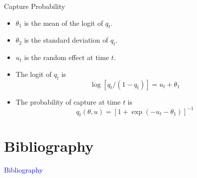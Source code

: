 \documentclass{beamer}
\newcommand{\Blue}[1]{\textcolor{blue}{#1}}
\newcommand{\Section}[1]{
	\section{#1}
	\begin{frame}
	\begin{center}
	\Blue{ \Large{#1} }
	\end{center}
	\end{frame}
}
\begin{document}
\begin{frame}{Capture Probability}
\begin{itemize}

\item
$\theta_1$ is the mean of the logit of $q_t$.
\pause

\item
$\theta_2$ is the standard deviation of $q_t$.
\pause

\item
$u_t$ is the random effect at time $t$.
\pause

\item
The logit of $q_t$ is
\[
	\log [ q_t / ( 1 - q_t ) ] = u_t + \theta_1
\]
\pause

\item
The probability of capture at time $t$ is
\[
	q_t ( \theta , u ) = [ 1 + \exp( - u_t - \theta_1 ) ]^{-1}
\]


\end{itemize}
\end{frame}
\Section{Bibliography}
%
{}

\end{document}
